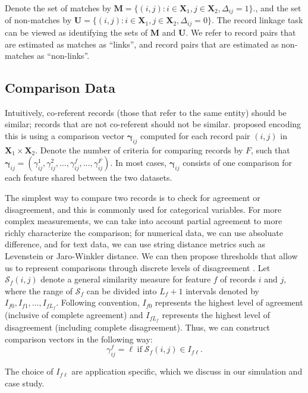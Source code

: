\documentclass[12pt,letterpaper]{article}
\newcommand{\1}[1]{\mathbb{I}\!\left[#1\right]} %
\begin{document}
Denote the set of matches by $\bm{M} = \{(i,j): i \in \bm{X}_1, j \in \bm{X}_2, \Delta_{ij} = 1\}.$, and the set of non-matches by 
$\bm{U} =  \{(i,j): i \in \bm{X}_1, j \in \bm{X}_2, \Delta_{ij} = 0\}.$ The record linkage task can be viewed as identifying the sets of  $\bm{M}$ and  $\bm{U}.$ We refer to record pairs that are estimated as matches as ``links'', and record pairs that are estimated as non-matches as ``non-links''.

\subsection{Comparison Data}
\label{comparison-data}

Intuitively, co-referent records (those that refer to the same entity) should be similar; records that are not co-referent should not be similar. \cite{fellegi_theory_1969} proposed encoding this is using a comparison vector $\bm{\gamma}_{ij}$ computed for each record pair $(i,j)$ in $\bm{X}_1 \times \bm{X}_2.$ Denote the number of criteria for comparing records by $F$, such that 
$\bm{\gamma}_{ij} = (\gamma_{ij}^1, \gamma_{ij}^2, \ldots, \gamma_{ij}^f, \ldots, \gamma_{ij}^F).$ In most cases, $\bm{\gamma}_{ij}$ consists of one comparison for each feature shared between the two datasets. 

The simplest way to compare two records is to check for agreement or disagreement, and this is commonly used for categorical variables. For more complex measurements, we can take into account partial agreement to more richly characterize the comparison; for numerical data, we can use absoluate difference, and for text data, we can use string distance metrics such as Levenstein or Jaro-Winkler distance. We can then propose thresholds that allow us to represent comparisons through discrete levels of disagreement \citep{bilenko2006riddle, elmagarmid_duplicate_2007}. Let $\mathcal{S}_f(i,j)$ denote a general similarity measure for feature $f$ of records $i$ and $j,$ where the range of $\mathcal{S}_f$ can be divided into $L_f +1$ intervals denoted by $I_{f0}, I_{f1}, \ldots, I_{fL_f}$. Following convention, $I_{f0}$ represents the highest level of agreement (inclusive of complete agreement) and $I_{fL_f}$ represents the highest level of disagreement (including complete disagreement). Thus, we can construct comparison vectors in the following way: 
$$\gamma_{ij}^f = \ell \; \text{if} \; \mathcal{S}_f(i,j) \in I_{f\ell}.$$

The choice of $I_{f\ell}$ are application specific, which we discuss in our simulation and case study. 
\end{document}
